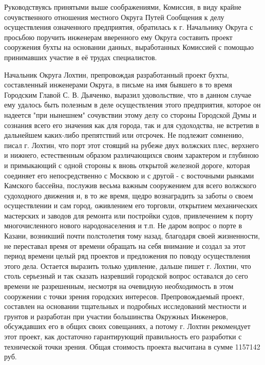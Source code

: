 \documentclass[oneside,final,14pt]{extreport}
\begin{document}
	Руководствуясь принятыми выше соображениями, Комиссия, в виду крайне сочувственного отношения местного Округа Путей Сообщения к делу осуществления означенного предприятия, обратилась к г. Начальнику Округа с просьбою поручить инженерам вверенного ему Округа составить проект сооружения бухты на основании данных, выработанных Комиссией с помощью принимавших участие в её трудах специалистов.
	
	Начальник Округа Лохтин, препровождая разработанный проект бухты, составленный инженерами Округа, в письме на имя бывшего в то время Городским Главой С. В. Дьяченко, выразил удовольствие, что в данном случае ему удалось быть полезным в деле осуществления этого предприятия, которое он надеется "при нынешнем" сочувствии этому делу со стороны Городской Думы и сознания всего его значения как для города, так и для судоходства, не встретив в дальнейшем каких-либо препятствий или отсрочек. Не подлежит сомнению, писал г. Лохтин, что порт этот стоящий на рубеже двух волжских плес, верхнего и нижнего, естественным образом различающихся своим характером и глубиною и примыкающий с одной стороны к вновь открытой железной дороге, которая соединяет его непосредственно с Москвою и с другой - с восточными рынками Камского бассейна, послужив весьма важным сооружением для всего волжского судоходного движения и, в то же время, щедро вознаградить за заботы о своем осуществлении и сам город, оживлением его торговли, открытием механических мастерских и заводов для ремонта или постройки судов, привлечением к порту многочисленного нового народонаселения и т.п. Не даром вопрос о порте в Казани, возникший почти полстолетия тому назад, благодаря своей жизненности, не переставал время от времени обращать на себя внимание и создал за этот период времени целый ряд проектов и предложения по поводу осуществления этого дела. Остается выразить только удивление, дальше пишет г. Лохтин, что столь серьезный и так сказать назревший городской вопрос оставался до сего времени не разрешенным, несмотря на очевидную необходимость в этом сооружении с точки зрения городских интересов. Препровождаемый проект, составлен на основании тщательных и подробных исследований местности и грунтов и разработан при участии большинства Окружных Инженеров, обсуждавших его в общих своих совещаниях, а потому г. Лохтин рекомендует этот проект, как достаточно гарантирующий правильность его разработки с технической точки зрения. Общая стоимость проекта высчитана в сумме 1157142 руб.
	
\end{document}
